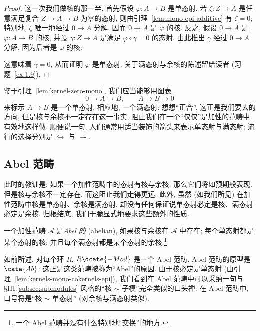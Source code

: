 \begin{proof}
这一次我们做核的那一半.
首先假设 $\varphi:A\to B$ 是单态射. 若 $\zeta:Z\to A$ 是任意满足复合 $Z\to A\to B$ 为零的态射, 则由引理~\ref{lem:mono-epi-additive} 有 $\zeta=0$; 特别地, $\zeta$ 唯一地经过 $0\to A$ 分解. 因而 $0\to A$ 是 $\varphi$ 的核.
反之, 假设 $0\to A$ 是 $\varphi:A\to B$ 的核, 并设 $\gamma:Z\to A$ 是满足 $\varphi\circ\gamma=0$ 的态射. 由此推出 $\gamma$ 经过 $0\to A$ 分解, 因为后者是 $\varphi$ 的核:
\begin{center}
\end{center}
这意味着 $\gamma=0$, 从而证明 $\varphi$ 是单态射.
关于满态射与余核的陈述留给读者 (习题~\ref{ex:1.9}).
\end{proof}

\indent 鉴于引理~\ref{lem:kernel-zero-mono}, 我们应当能够用图表
\[
0\longrightarrow A\longrightarrow B,\qquad A\longrightarrow B\longrightarrow 0
\]
来标示 $A\to B$ 是一个单态射, 相应地, 一个满态射: 想想``正合''. 这正是我们要去的方向, 但是核与余核不一定存在这一事实, 阻止我们在一个``仅仅''是加性的范畴中有效地这样做.
顺便说一句, 人们通常用适当装饰的箭头来表示单态射与满态射; 流行的选择分别是 $\hookrightarrow$ 与 $\twoheadrightarrow$.

\subsection{Abel 范畴}
\label{subsec:abelian-categories}

此时的教训是: 如果一个加性范畴中的态射有核与余核, 那么它们将如预期般表现. 但是核与余核不一定存在, 而这阻止我们走得更远. 此外, 虽然 (如我们所见) 在加性范畴中核是单态射、余核是满态射, 却没有任何保证说单态射必定是核、满态射必定是余核. 归根结底, 我们干脆显式地要求这些额外的性质.

\begin{definition}\label{def:abelian-category}
一个加性范畴 $\mathcal{A}$ 是\emph{Abel 的} (abelian), 如果核与余核在 $\mathcal{A}$ 中存在; 每个单态射都是某个态射的核; 并且每个满态射都是某个态射的余核.\footnote{一个 Abel 范畴并没有什么特别地``交换''的地方.}
\end{definition}

\indent 如前所述, 对每个环 $R$, $R\dcate{-Mod}$ 是一个 Abel 范畴. Abel 范畴的原型是 $\cate{Ab}$: 这正是这类范畴被称为``Abel''的原因.
由于核必定是单态射 (由引理~\ref{lem:kernels-mono-cokernels-epi}), 我们看到在 Abel 范畴中可以采纳一句与 §III.\ref{subsec:submodules} 风格的``核 $\sim$ 子模''完全类似的口头禅: 在 Abel 范畴中, 口号将是``核 $\sim$ 单态射'' (对余核与满态射类似).

